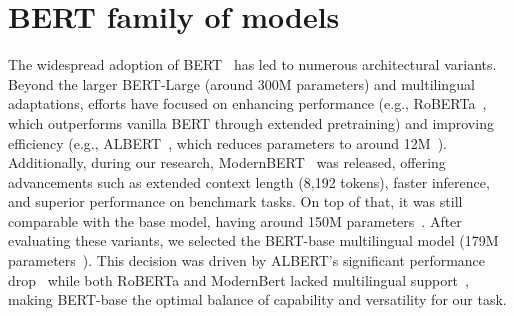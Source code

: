 \documentclass[licencjacka,en]{pracamgr}
\begin{document}
\section{BERT family of models}
The widespread adoption of BERT~\cite{BERT_hf} has led to numerous architectural variants. Beyond the larger BERT-Large (around 300M parameters) and multilingual adaptations, efforts have focused on enhancing performance (e.g., RoBERTa~\cite{RoBERTa}, which outperforms vanilla BERT through extended pretraining) and improving efficiency (e.g., ALBERT~\cite{ALBERT}, which reduces parameters to  around 12M~\cite{ALBERT_hf}).
Additionally, during our research, ModernBERT~\cite{ModernBERTPaper} was released, offering advancements such as extended context length (8,192 tokens), faster inference, and superior performance on benchmark tasks. On top of that, it was still comparable with the base model, having around 150M parameters~\cite{ModernBERThf}.
After evaluating these variants, we selected the BERT-base multilingual model (179M parameters~\cite{BERT_multiling}). This decision was driven by ALBERT’s significant performance drop~\cite{BERT_comp} while both RoBERTa and ModernBert lacked multilingual support~\cite{FBAIHF}, making BERT-base the optimal balance of capability and versatility for our task.
\end{document}
